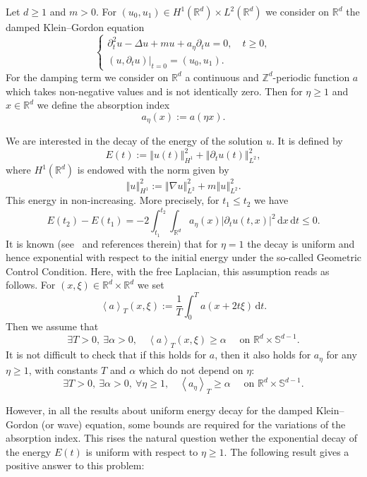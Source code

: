 \documentclass[11pt]{article}
\theoremstyle{definition}
\numberwithin{equation}{section}
\numberwithin{figure}{section}
\numberwithin{table}{section}
\newcommand{\abs}[1]{\left\vert #1\right\vert}
\newcommand{\nr}[1]{\left\Vert #1\right\Vert}
\newcommand{\pppg}[1] {\left< #1 \right>}
\renewcommand{\leq}{\leqslant}
\renewcommand{\geq}{\geqslant}
\newcommand{\1}{\mathds 1}
\newcommand{\R}{\mathbb{R}}
\renewcommand{\a}{\alpha}
\newcommand{\D}{\Delta}
\newcommand{\x}{\xi}
\newcommand{\dd}{\mathrm{d}}
\newcommand{\dx}{\dd x}
\newcommand{\dt}{\dd t}
\let\oldexists\exists
\renewcommand*{\exists}{\mathrel{\oldexists}}
\let\oldforall\forall
\renewcommand*{\forall}{\mathrel{\oldforall}}
\begin{document}
Let $d \geq 1$ and $m> 0$. For $(u_0,u_1) \in H^1(\R^d)\times L^2(\R^d)$ we consider on $\R^d$ the damped Klein--Gordon equation
\begin{equation}\label{KG}
\begin{cases}
\partial_t^2 u -\D u + mu + a_\eta \partial_t u = 0, \quad t \geq 0,\\
(u,\partial_t u)|_{t=0} = (u_0,u_1).
\end{cases}
\end{equation}
For the damping term we consider on $\R^d$ a continuous and $\mathbb Z^d$-periodic function $a$ which takes non-negative values and is not identically zero. Then for $\eta \geq 1$ and $x \in \R^d$ we define the absorption index
\[
a_\eta(x) := a(\eta x).
\]



We are interested in the decay of the energy of the solution $u$. It is defined by
\[
E(t) := \nr{u(t)}_{H^1}^2 + \nr{\partial_t u(t)}_{L^2}^2,
\]
where $H^1(\R^d)$ is endowed with the norm given by
\begin{equation}\label{def-norme-H1}
\nr{u}_{H^1}^2 := \nr{\nabla u}_{L^2}^2 + m \nr{u}_{L^2}^2.
\end{equation}
This energy in non-increasing. More precisely, for $t_1 \leq t_2$ we have
\[
E(t_2) - E(t_1) = -2 \int_{t_1}^{t_2} \int_{\R^d} a_\eta(x) \abs{\partial_t u(t,x)}^2 \, \dx \, \dt \leq 0.
\]
It is known (see~\cite{BurqJo} and references therein) that for $\eta = 1$ the decay is uniform and hence exponential with respect to the initial energy under the so-called Geometric Control Condition. Here, with the free Laplacian, this assumption reads as follows. For $(x,\x) \in \R^d \times \R^d$ we set
\[
\pppg {a}_T (x,\x) := \frac 1 T \int_0^T a(x+2t\x) \, \dt.
\]
Then we assume that
\begin{equation}\label{hyp-GCC-usual}
\exists T > 0,\ \exists \a > 0, \quad \pppg {a}_T (x,\x) \geq \a\quad \text{ on } \R^{d} \times \mathbb S^{d-1}.
\end{equation}
It is not difficult to check that if this holds for $a$, then it also holds for $a_\eta$ for any $\eta \geq 1$, with constants $T$ and $\a$ which do not depend on $\eta$:
\begin{equation}\label{hyp-GCC-unif}
\exists T > 0,\ \exists \a > 0,\ \forall \eta \geq 1, \quad \pppg {a_\eta}_T \geq \a \quad \text{ on } \R^{d} \times \mathbb S^{d-1}.
\end{equation}

However, in all the results about uniform energy decay for the damped Klein--Gordon (or wave) equation, some bounds are required for the variations of the absorption index. This rises the natural question wether the exponential decay of the energy $E(t)$ is uniform with respect to $\eta \geq 1$. The following result gives a positive answer to this problem:
\end{document}
